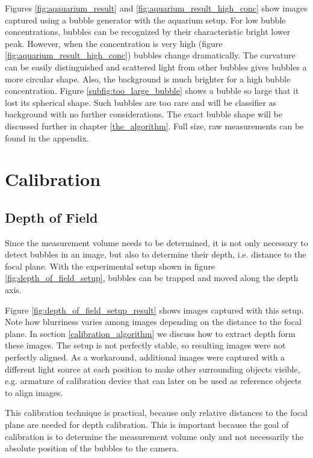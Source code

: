 			Figures \ref{fig:aqauarium_result} and \ref{fig:aquarium_result_high_conc} show images captured using a bubble generator with the aquarium setup. For low bubble concentrations, bubbles can be recognized by their characteristic bright lower peak. 
			However, when the concentration is very high (figure \ref{fig:aquarium_result_high_conc}) bubbles change dramatically. The curvature can be easily distinguished and scattered light from other bubbles gives bubbles a more circular shape. Also, the background is much brighter for a high bubble concentration. Figure \ref{subfig:too_large_bubble} shows a bubble so large that it lost its spherical shape. Such bubbles are too rare and will be classifier as background with no further considerations. 
			The exact bubble shape will be discussed further in chapter \ref{the_algorithm}.	Full size, raw measurements can be found in the appendix. 
	
	
	\section{Calibration}\label{calibration_setup}
		\subsection{Depth of Field}\label{sub:depth_of_field_setup}
			Since the measurement volume needs to be determined, it is not only necessary to detect bubbles in an image, but also to determine their depth, i.e. distance to the focal plane. With the experimental setup shown in figure \ref{fig:depth_of_field_setup}, bubbles can be trapped and moved along the depth axis. 
			
			Figure \ref{fig:depth_of_field_setup_result} shows images captured with this setup. Note how blurriness varies among images depending on the distance to the focal plane. In section \ref{calibration_algorithm} we discuss how to extract depth form these images. The setup is not perfectly stable, so resulting images were not perfectly aligned. As a workaround, additional images were captured with a different light source at each position to make other surrounding objects visible, e.g. armature of calibration device that can later on be used as reference objects to align images. 
			
			This calibration technique is practical, because only relative distances to the focal plane are needed for depth calibration. This is important because the goal of calibration is to determine the measurement volume only and not necessarily the absolute position of the bubbles to the camera. 
			
